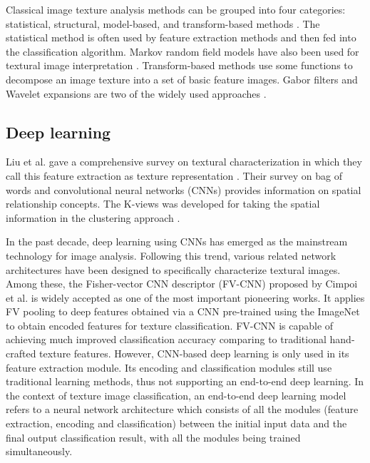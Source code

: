 \documentclass{aci}
\numberwithin{equation}{section}
\begin{document}
Classical image texture analysis methods can be grouped into four categories:
statistical, structural, model-based, and transform-based methods
\cite{bharati_image_2004}. The statistical method is often used by feature
extraction methods and then fed into the classification algorithm. Markov random
field models have also been used for textural image interpretation
\cite{hassner_use_1981, cross_markov_1983}. Transform-based methods use some
functions to decompose an image texture into a set of basic feature images.
Gabor filters and Wavelet expansions are two of the widely used approaches
\cite{bovik_multichannel_1990}.


\subsection{Deep learning}

Liu et al. gave a comprehensive survey on textural characterization in which
they call this feature extraction as texture representation \cite{liu_bow_2019}.
Their survey on bag of words and convolutional neural networks (CNNs)
\cite{krizhevsky_imagenet_2017} provides information on spatial relationship
concepts. The K-views was developed for taking the spatial information in the
clustering approach \cite{hung_image_2019}.

In the past decade, deep learning using CNNs has emerged as the mainstream
technology for image analysis. Following this trend, various related network
architectures have been designed to specifically characterize textural images.
Among these, the Fisher-vector CNN descriptor (FV-CNN) proposed by Cimpoi et al.
\cite{cimpoi_deep_2015} is widely accepted as one of the most important
pioneering works. It applies FV pooling to deep features obtained via a CNN
pre-trained using the ImageNet \cite{krizhevsky_imagenet_2017} to obtain encoded
features for texture classification. FV-CNN is capable of achieving much
improved classification accuracy comparing to traditional hand-crafted texture
features. However, CNN-based deep learning is only used in its feature
extraction module. Its encoding and classification modules still use traditional
learning methods, thus not supporting an end-to-end deep learning. In the
context of texture image classification, an end-to-end deep learning model
refers to a neural network architecture which consists of all the modules
(feature extraction, encoding and classification) between the initial input data
and the final output classification result, with all the modules being trained
simultaneously.
\end{document}
